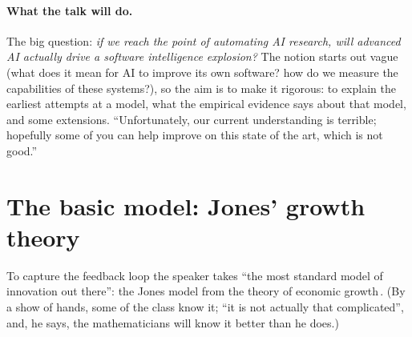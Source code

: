 \paragraph{What the talk will do.}
The big question: \emph{if we reach the point of automating AI research, will advanced AI actually drive a software intelligence explosion?} The notion starts out vague (what does it mean for AI to improve its own software? how do we measure the capabilities of these systems?), so the aim is to make it rigorous: to explain the earliest attempts at a model, what the empirical evidence says about that model, and some extensions. ``Unfortunately, our current understanding is terrible; hopefully some of you can help improve on this state of the art, which is not good.''

\section{The basic model: Jones' growth theory}\label{sec:L4-jones}
To capture the feedback loop the speaker takes ``the most standard model of innovation out there'': the Jones model from the theory of economic growth\,\citep{jones1995}. (By a show of hands, some of the class know it; ``it is not actually that complicated'', and, he says, the mathematicians will know it better than he does.)

